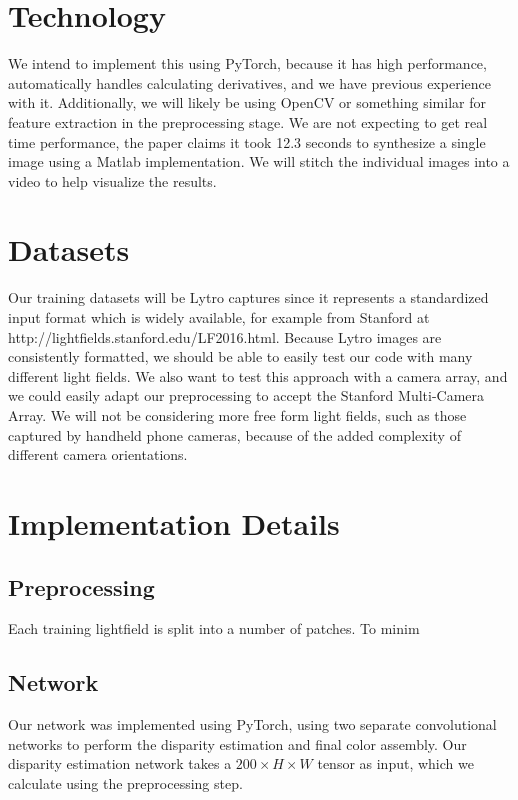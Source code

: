 \documentclass[10pt,twocolumn,letterpaper]{article}
\begin{document}
\section{Technology}

We intend to implement this using PyTorch, because it has high performance, 
automatically handles calculating derivatives, and we have previous experience with it.
Additionally, we will likely be using OpenCV or something similar for feature extraction
in the preprocessing stage.
We are not expecting to get real time performance, the paper claims it took 12.3 seconds to synthesize
a single image using a Matlab implementation. We will stitch the individual images into a video to
help visualize the results.

\section{Datasets}

Our training datasets will be Lytro captures since it represents a standardized input format which is
widely available, for example from Stanford at http://lightfields.stanford.edu/LF2016.html.
Because Lytro images are consistently formatted, we should be able to easily test our code with many different
light fields. We also want to test this approach with a camera array, and we could easily adapt our preprocessing
to accept the Stanford Multi-Camera Array. We will not be considering more free form light fields, such as those
captured by handheld phone cameras, because of the added complexity of different camera orientations.

\section{Implementation Details}


\subsection{Preprocessing}

Each training lightfield is split into a number of patches. To minim

\subsection{Network}

Our network was implemented using PyTorch, using two separate convolutional networks to perform the
disparity estimation and final color assembly. Our disparity estimation network takes a 
$200 \times H \times W$ tensor as input, which we calculate using the preprocessing step.
\end{document}
